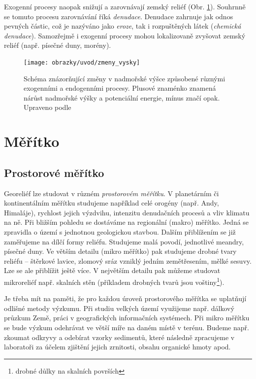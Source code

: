 Exogenní procesy naopak snižují a zarovnávají zemský reliéf (Obr. \ref{fig:zmenyvysky}). Souhrnně se tomuto procesu zarovnávání říká \emph{denudace}. Denudace zahrnuje jak odnos pevných částic, což je nazýváno jako \emph{eroze}, tak i rozpuštěných látek (\emph{chemická denudace}). Samozřejmě i exogenní procesy mohou lokalizovaně zvyšovat zemský reliéf (např. písečné duny, morény).

\begin{figure}[ht]
	\centering
	\texttt{[image: obrazky/uvod/zmeny\_vysky]}
	\caption{Schéma znázorňující změny v nadmořské výšce způsobené různými exogenními a endogenními procesy. Plusové znaménko znamená nárůst nadmořské výšky a potenciální energie, mínus značí opak. Upraveno podle \textcite{summerfieldGlobalGeomorphologyIntroduction1999}}
	\label{fig:zmenyvysky}
\end{figure}


\section{Měřítko}
\subsection{Prostorové měřítko}
Georeliéf lze studovat v různém \emph{prostorovém měřítku}. V planetárním či kontinentálním měřítku studujeme například celé orogény (např. Andy, Himaláje), rychlost jejich výzdvihu, intenzitu denudačních procesů a vliv klimatu na ně. Při bližším pohledu se dostáváme na regionální (makro) měřítko. Jedná se zpravidla o území s jednotnou geologickou stavbou. Dalším přiblížením se již zaměřujeme na dílčí formy reliéfu. Studujeme malá povodí, jednotlivé meandry, písečné duny. Ve větším detailu (mikro měřítko) pak studujeme drobné tvary reliéfu -- štěrkové lavice, zlomový sráz vzniklý jedním zemětřesením, mělké sesuvy. Lze se ale přiblížit ještě více. V největším detailu pak můžeme studovat mikroreliéf např. skalních stěn (příkladem drobných tvarů jsou voštiny\footnote{drobné důlky na skalních površích}). 

Je třeba mít na paměti, že pro každou úroveň prostorového měřítka se uplatňují odlišné metody výzkumu. Při studiu velkých území využijeme např. dálkový průzkum Země, práci v geografických informačních systémech. Při mikro měřítku se bude výzkum odehrávat ve větší míře na daném místě v terénu. Budeme např. zkoumat odkryvy a odebírat vzorky sedimentů, které následně zpracujeme v laboratoři za účelem zjištění jejich zrnitosti, obsahu organické hmoty apod.

